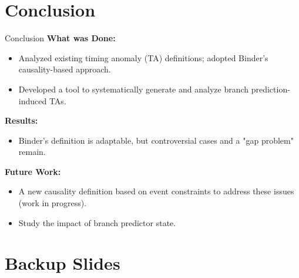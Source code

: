 \documentclass{beamer}
\begin{document}


\section{Conclusion}

\begin{frame}{Conclusion}
    \textbf{What was Done:}
    \begin{itemize}
        \item Analyzed existing timing anomaly (TA) definitions; adopted Binder's causality-based approach.
        \item Developed a tool to systematically generate and analyze branch prediction-induced TAs.
    \end{itemize}

    \textbf{Results:}
    \begin{itemize}
        \item Binder's definition is adaptable, but controversial cases and a "gap problem" remain.
    \end{itemize}

    \textbf{Future Work:}
    \begin{itemize}
        \item A new causality definition based on event constraints to address these issues (work in progress).
        \item Study the impact of branch predictor state.
    \end{itemize}


\end{frame}

\appendix

\section{Backup Slides}
\end{document}
